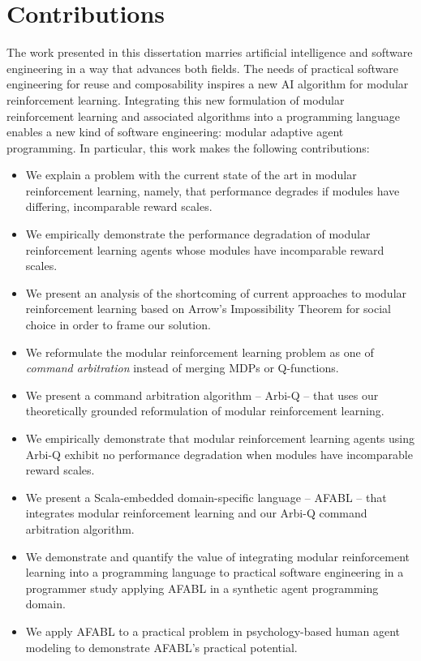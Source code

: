\section{Contributions}

The work presented in this dissertation marries artificial intelligence and software engineering in a way that advances both fields. The needs of practical software engineering for reuse and composability inspires a new AI algorithm for modular reinforcement learning. Integrating this new formulation of modular reinforcement learning and associated algorithms into a programming language enables a new kind of software engineering: modular adaptive agent programming. In particular, this work makes the following contributions:

\begin{itemize}
\item We explain a problem with the current state of the art in modular reinforcement learning, namely, that performance degrades if modules have differing, incomparable reward scales.
\item We empirically demonstrate the performance degradation of modular reinforcement learning agents whose modules have incomparable reward scales.
\item We present an analysis of the shortcoming of current approaches to modular reinforcement learning based on Arrow's Impossibility Theorem for social choice in order to frame our solution.
\item We reformulate the modular reinforcement learning problem as one of {\it command arbitration} instead of merging MDPs or Q-functions.
\item We present a command arbitration algorithm -- Arbi-Q -- that uses our theoretically grounded reformulation of modular reinforcement learning.
\item We empirically demonstrate that modular reinforcement learning agents using Arbi-Q exhibit no performance degradation when modules have incomparable reward scales.
\item We present a Scala-embedded domain-specific language -- AFABL -- that integrates modular reinforcement learning and our Arbi-Q command arbitration algorithm.
\item We demonstrate and quantify the value of integrating modular reinforcement learning into a programming language to practical software engineering in a programmer study applying AFABL in a synthetic agent programming domain.
\item We apply AFABL to a practical problem in psychology-based human agent modeling to demonstrate AFABL's practical potential.
\end{itemize}

